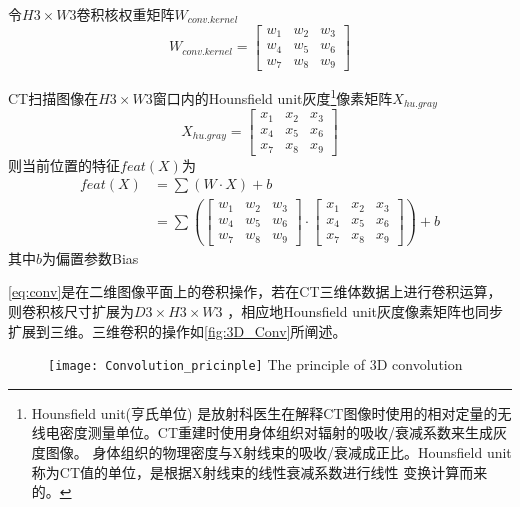 令$H3 \times W3$卷积核权重矩阵$W_{conv.kernel}$
\begin{equation}
    W_{conv.kernel} = \begin{bmatrix}
        w_1 & w_2 & w_3 \\
        w_4 & w_5 & w_6 \\
        w_7 & w_8 & w_9
    \end{bmatrix}
\end{equation}

CT扫描图像在$H3 \times W3$窗口内的Hounsfield unit\cite{HU2016CT}灰度\footnote{Hounsfield unit(亨氏单位)
是放射科医生在解释CT图像时使用的相对定量的无线电密度测量单位。CT重建时使用身体组织对辐射的吸收/衰减系数来生成灰度图像。
身体组织的物理密度与X射线束的吸收/衰减成正比。Hounsfield unit称为CT值的单位，是根据X射线束的线性衰减系数进行线性
变换计算而来的。}像素矩阵$X_{hu.gray}$
\begin{equation}
    X_{hu.gray} = \begin{bmatrix}
        x_1 & x_2 & x_3 \\
        x_4 & x_5 & x_6 \\
        x_7 & x_8 & x_9
    \end{bmatrix}
\end{equation}
则当前位置的特征$feat(X)$为
\begin{equation}\label{eq:conv}
\begin{split}
    {feat}(X) &= \sum{\left(W \cdot X\right)} + b \\
            &= \sum{\left(\begin{bmatrix}
                        w_1 & w_2 & w_3 \\
                        w_4 & w_5 & w_6 \\
                        w_7 & w_8 & w_9
                    \end{bmatrix} \cdot 
                    \begin{bmatrix}
                        x_1 & x_2 & x_3 \\
                        x_4 & x_5 & x_6 \\
                        x_7 & x_8 & x_9
                    \end{bmatrix}\right)} + b
\end{split}
\end{equation}
其中$b$为偏置参数Bias

\autoref{eq:conv}是在二维图像平面上的卷积操作，若在CT三维体数据上进行卷积运算，则卷积核尺寸扩展为$D3 \times H3 \times W3$
，相应地Hounsfield unit灰度像素矩阵也同步扩展到三维。三维卷积的操作如\autoref{fig:3D_Conv}所阐述。
\begin{figure}[!htp]
    \centering
    \texttt{[image: Convolution\_pricinple]}
        {The principle of 3D convolution}
    \label{fig:3D_Conv}
\end{figure}


